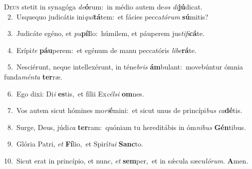 \lettrine{\initial\textcolor{\initialcolor}{D}}{eus} stetit in synagóga \textit{de}\-\textbf{ó}rum:~\star in médio autem de\textit{os} \textit{di}\-\textbf{jú}dicat.\\
{\numbfont\textcolor{\numbcolor}{~2.}}~Usquequo judicátis ini\-\textit{qui}\-\textbf{tá}tem:~\star et fácies pecca\-\textit{tó}\-\textit{rum} \textbf{sú}\-mitis?\par
{\numbfont\textcolor{\numbcolor}{~3.}}~Judicáte egéno, et \textit{pu}\-\textbf{píl}lo:~\star húmilem, et páuperem jus\-\textit{ti}\-\textit{fi}\textbf{cá}te.\par
{\numbfont\textcolor{\numbcolor}{~4.}}~Erípi\textit{te} \textbf{páu}\-perem:~\star et egénum de manu peccatóris \textit{li}\-\textit{be}\textbf{rá}te.\par
{\numbfont\textcolor{\numbcolor}{~5.}}~Nesciérunt, neque intellexérunt, in téne\textit{bris} \textbf{ám}\-bulant:~\star movebúntur ómnia funda\-\textit{mén}\-\textit{ta} \textbf{ter}\-ræ.\par
{\numbfont\textcolor{\numbcolor}{~6.}}~Ego dixi: Di\textit{i} \textbf{es}\-tis,~\star et fílii Ex\-\textit{cél}\-\textit{si} \textbf{om}\-nes.\par
{\numbfont\textcolor{\numbcolor}{~7.}}~Vos autem sicut hómines mo\-\textit{ri}\-\textbf{é}mini:~\star et sicut unus de princípi\textit{bus} \textit{ca}\-\textbf{dé}tis.\par
{\numbfont\textcolor{\numbcolor}{~8.}}~Surge, Deus, júdi\textit{ca} \textbf{ter}\-ram:~\star quóniam tu hereditábis in óm\-\textit{ni}\-\textit{bus} \textbf{Gén}\-tibus.\par
{\numbfont\textcolor{\numbcolor}{~9.}}~Glória Patri, \textit{et} \textbf{Fí}\-lio,~\star et Spirí\-\textit{tu}\-\textit{i} \textbf{Sanc}\-to.\par
{\numbfont\textcolor{\numbcolor}{10.}}~Sicut erat in princípio, et nunc, \textit{et} \textbf{sem}\-per,~\star et in sǽcula sæcu\-\textit{ló}\-\textit{rum}. \textbf{A}\-men.\par
